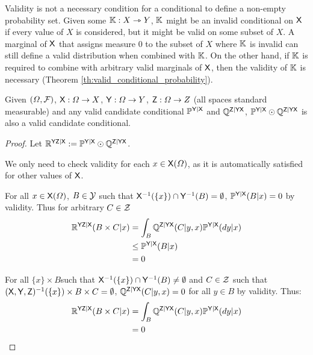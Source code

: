 Validity is not a necessary condition for a conditional to define a non-empty probability set. Given some $\mathbb{K}:X\rightarrowtriangle Y$, $\mathbb{K}$ might be an invalid conditional on $\mathsf{X}$ if every value of $X$ is considered, but it might be valid on some subset of $X$. A marginal of $\mathsf{X}$ that assigns measure 0 to the subset of $X$ where $\mathbb{K}$ is invalid can still define a valid distribution when combined with $\mathbb{K}$. On the other hand, if $\mathbb{K}$ is required to combine with arbitrary valid marginals of $\mathsf{X}$, then the validity of $\mathbb{K}$ is necessary (Theorem \ref{th:valid_conditional_probability}).

\begin{theorem}\label{lem:valid_extendability}
Given $(\Omega,\mathcal{F})$, $\mathsf{X}:\Omega\to X$, $\mathsf{Y}:\Omega\to Y$, $\mathsf{Z}:\Omega\to Z$ (all spaces standard measurable) and any valid candidate conditional $\mathbb{P}^{\mathsf{Y}|\mathsf{X}}$ and $\mathbb{Q}^{\mathsf{Z}|\mathsf{Y}\mathsf{X}}$, $ \mathbb{P}^{\mathsf{Y}|\mathsf{X}}\odot \mathbb{Q}^{\mathsf{Z}|\mathsf{Y}\mathsf{X}}$ is also a valid candidate conditional.
\end{theorem}

\begin{proof}
Let $\mathbb{R}^{\mathsf{YZ}|\mathsf{X}}:=\mathbb{P}^{\mathsf{Y}|\mathsf{X}}\odot \mathbb{Q}^{\mathsf{Z}|\mathsf{Y}\mathsf{X}}$.

We only need to check validity for each $x\in \mathsf{X}(\Omega)$, as it is automatically satisfied for other values of $\mathsf{X}$.

For all $x\in \mathsf{X}(\Omega)$, $B\in \mathcal{Y}$ such that $\mathsf{X}^{-1}( \{x\})\cap\mathsf{Y}^{-1}( B)=\emptyset$, $\mathbb{P}^{\mathsf{Y}|\mathsf{X}}(B|x)=0$ by validity. Thus for arbitrary $C\in \mathcal{Z}$
\begin{align}
    \mathbb{R}^{\mathsf{YZ}|\mathsf{X}}(B\times C|x) &= \int_B \mathbb{Q}^{\mathsf{Z}|\mathsf{YX}}(C|y,x)\mathbb{P}^{\mathsf{Y}|\mathsf{X}}(dy|x)\\
                                  &\leq \mathbb{P}^{\mathsf{Y}|\mathsf{X}}(B|x)\\
                                  &=0
\end{align}

For all $\{x\}\times B$such that $\mathsf{X}^{-1}( \{x\})\cap\mathsf{Y}^{-1}( B)\neq \emptyset$ and $C\in \mathcal{Z}$ such that $(\mathsf{X},\mathsf{Y},\mathsf{Z})^{-1} (\{x\})\times B\times C=\emptyset$, $\mathbb{Q}^{\mathsf{Z}|\mathsf{YX}}(C|y,x)=0$ for all $y\in B$ by validity. Thus:
\begin{align}
    \mathbb{R}^{\mathsf{YZ}|\mathsf{X}}(B\times C|x) &= \int_B \mathbb{Q}^{\mathsf{Z}|\mathsf{YX}}(C|y,x)\mathbb{P}^{\mathsf{Y}|\mathsf{X}}(dy|x)\\
                                            &=0
\end{align}
\end{proof}

